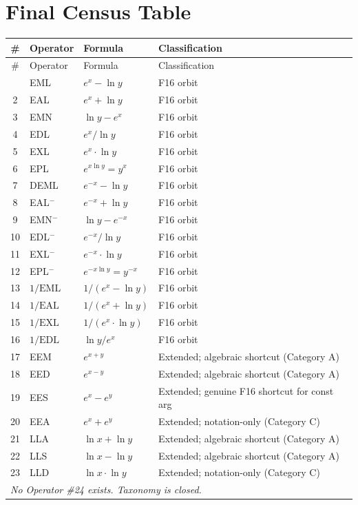 \documentclass[11pt]{article}
\begin{document}
\section{Final Census Table}

\begin{longtable}{clll}
\toprule
\# & Operator & Formula & Classification \\
\midrule
\endfirsthead
\toprule
\# & Operator & Formula & Classification \\
\midrule
\endhead
\bottomrule
\endfoot
1  & EML  & $e^x - \ln y$           & F16 orbit \\
2  & EAL  & $e^x + \ln y$           & F16 orbit \\
3  & EMN  & $\ln y - e^x$           & F16 orbit \\
4  & EDL  & $e^x / \ln y$           & F16 orbit \\
5  & EXL  & $e^x \cdot \ln y$       & F16 orbit \\
6  & EPL  & $e^{x \ln y} = y^x$     & F16 orbit \\
7  & DEML & $e^{-x} - \ln y$        & F16 orbit \\
8  & EAL$^-$ & $e^{-x} + \ln y$    & F16 orbit \\
9  & EMN$^-$ & $\ln y - e^{-x}$    & F16 orbit \\
10 & EDL$^-$ & $e^{-x} / \ln y$    & F16 orbit \\
11 & EXL$^-$ & $e^{-x} \cdot \ln y$ & F16 orbit \\
12 & EPL$^-$ & $e^{-x \ln y} = y^{-x}$ & F16 orbit \\
13 & $1/\mathrm{EML}$ & $1/(e^x - \ln y)$ & F16 orbit \\
14 & $1/\mathrm{EAL}$ & $1/(e^x + \ln y)$ & F16 orbit \\
15 & $1/\mathrm{EXL}$ & $1/(e^x \cdot \ln y)$ & F16 orbit \\
16 & $1/\mathrm{EDL}$ & $\ln y / e^x$ & F16 orbit \\
\midrule
17 & EEM  & $e^{x+y}$               & Extended; algebraic shortcut (Category A) \\
18 & EED  & $e^{x-y}$               & Extended; algebraic shortcut (Category A) \\
19 & EES  & $e^x - e^y$             & Extended; genuine F16 shortcut for const arg \\
20 & EEA  & $e^x + e^y$             & Extended; notation-only (Category C) \\
21 & LLA  & $\ln x + \ln y$         & Extended; algebraic shortcut (Category A) \\
22 & LLS  & $\ln x - \ln y$         & Extended; algebraic shortcut (Category A) \\
23 & LLD  & $\ln x \cdot \ln y$     & Extended; notation-only (Category C) \\
\midrule
\multicolumn{4}{l}{\textit{No Operator \#24 exists. Taxonomy is closed.}} \\
\end{longtable}
\end{document}
